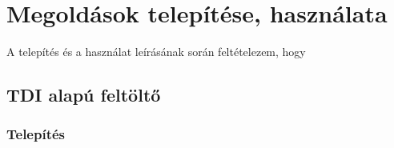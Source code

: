 \chapter{Megoldások telepítése, használata}
A telepítés és a használat leírásának során feltételezem, hogy 
\section{TDI alapú feltöltő}
\subsection{Telepítés}
